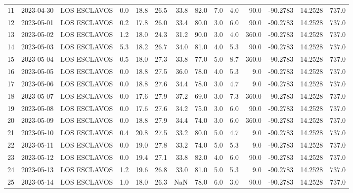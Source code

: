 \documentclass[12pt]{article}
\begin{document}
\begin{center}
\begin{tabular}{lllrrrrrrrrrrr}
11  & 2023-04-30 &  LOS ESCLAVOS &     0.0 &  18.8 &   26.5 &  33.8 &     82.0 &  7.0 &         4.0 &        90.0 &  -90.2783 &  14.2528 &    737.0 \\
12  & 2023-05-01 &  LOS ESCLAVOS &     0.2 &  17.8 &   26.0 &  33.4 &     80.0 &  3.0 &         6.0 &        90.0 &  -90.2783 &  14.2528 &    737.0 \\
13  & 2023-05-02 &  LOS ESCLAVOS &     1.2 &  18.0 &   24.3 &  31.2 &     90.0 &  3.0 &         4.0 &       360.0 &  -90.2783 &  14.2528 &    737.0 \\
14  & 2023-05-03 &  LOS ESCLAVOS &     5.3 &  18.2 &   26.7 &  34.0 &     81.0 &  4.0 &         5.3 &        90.0 &  -90.2783 &  14.2528 &    737.0 \\
15  & 2023-05-04 &  LOS ESCLAVOS &     0.5 &  18.0 &   27.3 &  33.8 &     77.0 &  5.0 &         8.7 &       360.0 &  -90.2783 &  14.2528 &    737.0 \\
16  & 2023-05-05 &  LOS ESCLAVOS &     0.0 &  18.8 &   27.5 &  36.0 &     78.0 &  4.0 &         5.3 &         9.0 &  -90.2783 &  14.2528 &    737.0 \\
17  & 2023-05-06 &  LOS ESCLAVOS &     0.0 &  18.8 &   27.6 &  34.4 &     78.0 &  3.0 &         4.7 &         9.0 &  -90.2783 &  14.2528 &    737.0 \\
18  & 2023-05-07 &  LOS ESCLAVOS &     0.0 &  17.6 &   27.9 &  37.2 &     69.0 &  3.0 &         7.3 &       360.0 &  -90.2783 &  14.2528 &    737.0 \\
19  & 2023-05-08 &  LOS ESCLAVOS &     0.0 &  17.6 &   27.6 &  34.2 &     75.0 &  3.0 &         6.0 &        90.0 &  -90.2783 &  14.2528 &    737.0 \\
20  & 2023-05-09 &  LOS ESCLAVOS &     0.0 &  18.8 &   27.9 &  34.4 &     74.0 &  3.0 &         6.0 &       360.0 &  -90.2783 &  14.2528 &    737.0 \\
21  & 2023-05-10 &  LOS ESCLAVOS &     0.4 &  20.8 &   27.5 &  33.2 &     80.0 &  5.0 &         4.7 &         9.0 &  -90.2783 &  14.2528 &    737.0 \\
22  & 2023-05-11 &  LOS ESCLAVOS &     0.0 &  19.0 &   27.8 &  33.2 &     74.0 &  5.0 &         5.3 &         9.0 &  -90.2783 &  14.2528 &    737.0 \\
23  & 2023-05-12 &  LOS ESCLAVOS &     0.0 &  19.4 &   27.1 &  33.8 &     82.0 &  4.0 &         6.0 &        90.0 &  -90.2783 &  14.2528 &    737.0 \\
24  & 2023-05-13 &  LOS ESCLAVOS &     1.2 &  19.6 &   26.8 &  33.0 &     81.0 &  5.0 &         5.3 &         9.0 &  -90.2783 &  14.2528 &    737.0 \\
25  & 2023-05-14 &  LOS ESCLAVOS &     1.0 &  18.0 &   26.3 &   NaN &     78.0 &  6.0 &         3.0 &        90.0 &  -90.2783 &  14.2528 &    737.0 \\
\bottomrule
\end{tabular}

        
        \end{center}
        
\end{document}
